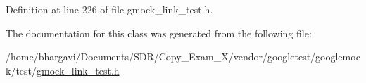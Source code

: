 Definition at line 226 of file gmock\+\_\+link\+\_\+test.\+h.



The documentation for this class was generated from the following file\+:\begin{DoxyCompactItemize}
\item 
/home/bhargavi/\+Documents/\+S\+D\+R/\+Copy\+\_\+\+Exam\+\_\+X/vendor/googletest/googlemock/test/\hyperlink{gmock__link__test_8h}{gmock\+\_\+link\+\_\+test.\+h}\end{DoxyCompactItemize}
